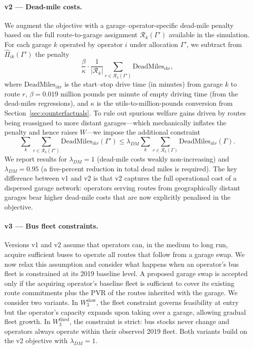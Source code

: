 \documentclass[12pt]{article}
\begin{document}
\paragraph{v2 --- Dead-mile costs.}
We augment the objective with a garage--operator-specific dead-mile penalty
based on the full route-to-garage assignment $\mathcal{R}_k(\Gamma')$
available in the simulation. For each garage $k$ operated by operator $i$
under allocation $\Gamma'$, we subtract from $\hat{\Pi}_{ik}(\Gamma')$ the
penalty
%
\begin{equation}
  \frac{\beta}{\kappa} \cdot \frac{1}{|\mathcal{R}_k|}
  \sum_{r \in \mathcal{R}_k(\Gamma')} \mathrm{DeadMiles}_{ikr},
\end{equation}
%
where $\mathrm{DeadMiles}_{ikr}$ is the start--stop drive time (in minutes)
from garage $k$ to route $r$, $\beta = 0.019$ million pounds per minute of
empty driving time (from the dead-miles regressions), and $\kappa$ is the
utils-to-million-pounds conversion from Section~\ref{sec:counterfactuals}. To
rule out spurious welfare gains driven by routes being reassigned to more
distant garages---which mechanically inflates the penalty and hence raises
$W$---we impose the additional constraint
%
\begin{equation}
  \label{eq:c_dm}
  \sum_{k} \sum_{r \in \mathcal{R}_k(\Gamma')} \mathrm{DeadMiles}_{ikr}(\Gamma')
  \leq \lambda_{DM}
  \sum_{k} \sum_{r \in \mathcal{R}_k(\Gamma)} \mathrm{DeadMiles}_{ikr}(\Gamma).
\end{equation}
%
We report results for $\lambda_{DM} = 1$ (dead-mile costs weakly
non-increasing) and $\lambda_{DM} = 0.95$ (a five-percent reduction in total
dead miles is required). The key difference between v1 and v2 is that v2
captures the full operational cost of a dispersed garage network: operators
serving routes from geographically distant garages bear higher dead-mile costs
that are now explicitly penalised in the objective.
 
\paragraph{v3 --- Bus fleet constraints.}
Versions v1 and v2 assume that operators can, in the medium to long run,
acquire sufficient buses to operate all routes that follow from a garage swap.
We now relax this assumption and consider what happens when an operator's bus
fleet is constrained at its 2019 baseline level. A proposed garage swap is
accepted only if the acquiring operator's baseline fleet is sufficient to cover
its existing route commitments plus the PVR of the routes inherited with the
garage. We consider two variants. In $W_3^{\mathrm{slow}}$, the fleet
constraint governs feasibility at entry but the operator's capacity expands
upon taking over a garage, allowing gradual fleet growth. In
$W_3^{\mathrm{fixed}}$, the constraint is strict: bus stocks never change and
operators always operate within their observed 2019 fleet. Both variants build
on the v2 objective with $\lambda_{DM} = 1$.
 
\end{document}
